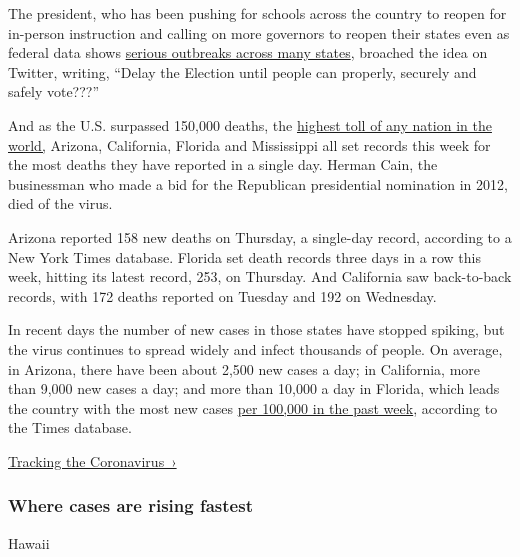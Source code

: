 The president, who has been pushing for schools across the country to
reopen for in-person instruction and calling on more governors to reopen
their states even as federal data shows
\href{https://www.nytimes.com/interactive/2020/07/28/us/states-report-virus-response-july-26.html}{serious
outbreaks across many states}, broached the idea on Twitter, writing,
``Delay the Election until people can properly, securely and safely
vote???''

And as the U.S. surpassed 150,000 deaths, the
\href{https://www.nytimes.com/interactive/2020/world/coronavirus-maps.html}{highest
toll of any nation in the world,} Arizona, California, Florida and
Mississippi all set records this week for the most deaths they have
reported in a single day. Herman Cain, the businessman who made a bid
for the Republican presidential nomination in 2012, died of the virus.

Arizona reported 158 new deaths on Thursday, a single-day record,
according to a New York Times database. Florida set death records three
days in a row this week, hitting its latest record, 253, on Thursday.
And California saw back-to-back records, with 172 deaths reported on
Tuesday and 192 on Wednesday.

In recent days the number of new cases in those states have stopped
spiking, but the virus continues to spread widely and infect thousands
of people. On average, in Arizona, there have been about 2,500 new cases
a day; in California, more than 9,000 new cases a day; and more than
10,000 a day in Florida, which leads the country with the most new cases
\href{https://www.nytimes.com/interactive/2020/us/coronavirus-us-cases.html}{per
100,000 in the past week}, according to the Times database.

\href{https://www.nytimes.com/interactive/2020/us/coronavirus-us-cases.html}{Tracking
the Coronavirus~›}

\href{https://www.nytimes.com/interactive/2020/us/coronavirus-us-cases.html}{}

\hypertarget{where-cases-are-rising-fastest}{%
\subsubsection{\texorpdfstring{Where cases are \textbf{rising}
fastest}{Where cases are rising fastest}}\label{where-cases-are-rising-fastest}}

\href{https://www.nytimes.com/interactive/2020/us/hawaii-coronavirus-cases.html}{}

Hawaii


